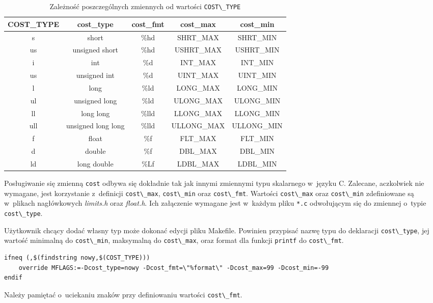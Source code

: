 \documentclass[a4paper,12pt,polish,oneside]{thesis}
\newcommand\code[1]{\lstinline[style=line]{#1}}
\begin{document}
\begin{table}[htb]
\caption{Zależność poszczególnych zmiennych od wartości \code{COST\_TYPE}}
\label{tab:dep}
\begin{tabular}{ | c | c | c | c | c | }
	\hline
	COST\_TYPE  & cost\_type            & cost\_fmt  & cost\_max      & cost\_min      \\
	\hline \hline
	s           & short                 & \%hd       & SHRT\_MAX      & SHRT\_MIN      \\ \hline
	us          & unsigned short        & \%hd       & USHRT\_MAX     & USHRT\_MIN     \\ \hline
	i           & int                   & \%d        & INT\_MAX       & INT\_MIN       \\ \hline
	us          & unsigned int          & \%d        & UINT\_MAX      & UINT\_MIN      \\ \hline
	l           & long                  & \%ld       & LONG\_MAX      & LONG\_MIN      \\ \hline
	ul          & unsigned long         & \%ld       & ULONG\_MAX     & ULONG\_MIN     \\ \hline
	ll          & long long             & \%lld      & LLONG\_MAX     & LLONG\_MIN     \\ \hline
	ull         & unsigned long long    & \%lld      & ULLONG\_MAX    & ULLONG\_MIN    \\ \hline
	f           & float                 & \%f        & FLT\_MAX       & FLT\_MIN       \\ \hline
	d           & double                & \%f        & DBL\_MAX       & DBL\_MIN       \\ \hline
	ld          & long double           & \%Lf       & LDBL\_MAX      & LDBL\_MIN      \\ \hline
\end{tabular}
\end{table}

Posługiwanie się zmienną \code{cost} odbywa się dokładnie tak jak innymi zmiennymi typu skalarnego w~języku C.
Zalecane, aczkolwiek nie wymagane, jest korzystanie z~definicji \code{cost\_max}, \code{cost\_min} oraz \code{cost\_fmt}.
Wartości \code{cost\_max} oraz \code{cost\_min} zdefiniowane są w~plikach nagłówkowych \emph{limits.h} oraz \emph{float.h}. Ich załączenie wymagane jest w~każdym pliku \code{*.c} odwołującym się do zmiennej o~typie \code{cost\_type}.

Użytkownik chcący dodać własny typ może dokonać edycji pliku Makefile.
Powinien przypisać nazwę typu do deklaracji \code{cost\_type}, jej wartość minimalną do \code{cost\_min}, maksymalną do \code{cost\_max}, oraz format dla funkcji \code{printf} do \code{cost\_fmt}.
\begin{lstlisting}[style=coden,caption=Przykład nowego typu kosztu krawędzi]
ifneq (,$(findstring nowy,$(COST_TYPE)))
	override MFLAGS:=-Dcost_type=nowy -Dcost_fmt=\"%format\" -Dcost_max=99 -Dcost_min=-99
endif

\end{lstlisting}
Należy pamiętać o~uciekaniu znaków przy definiowaniu wartości \code{cost\_fmt}.
\end{document}
